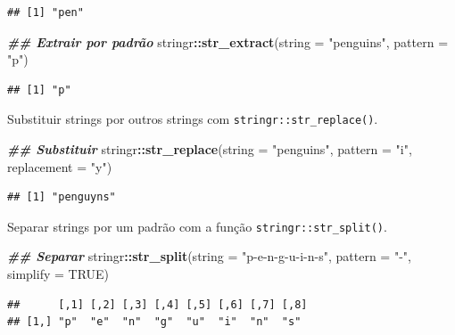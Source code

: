 \documentclass[
]{article}
\newenvironment{Shaded}{\begin{snugshade}}{\end{snugshade}}
\newcommand{\AttributeTok}[1]{\textcolor[rgb]{0.13,0.29,0.53}{#1}}
\newcommand{\ConstantTok}[1]{\textcolor[rgb]{0.56,0.35,0.01}{#1}}
\newcommand{\DocumentationTok}[1]{\textcolor[rgb]{0.56,0.35,0.01}{\textbf{\textit{#1}}}}
\newcommand{\FunctionTok}[1]{\textcolor[rgb]{0.13,0.29,0.53}{\textbf{#1}}}
\newcommand{\NormalTok}[1]{#1}
\newcommand{\SpecialCharTok}[1]{\textcolor[rgb]{0.81,0.36,0.00}{\textbf{#1}}}
\newcommand{\StringTok}[1]{\textcolor[rgb]{0.31,0.60,0.02}{#1}}
\begin{document}
\begin{verbatim}
## [1] "pen"
\end{verbatim}

\begin{Shaded}
\begin{Highlighting}[]
\DocumentationTok{\#\# Extrair por padrão}
\NormalTok{stringr}\SpecialCharTok{::}\FunctionTok{str\_extract}\NormalTok{(}\AttributeTok{string =} \StringTok{"penguins"}\NormalTok{, }\AttributeTok{pattern =} \StringTok{"p"}\NormalTok{)}
\end{Highlighting}
\end{Shaded}

\begin{verbatim}
## [1] "p"
\end{verbatim}

Substituir strings por outros strings com \texttt{stringr::str\_replace()}.

\begin{Shaded}
\begin{Highlighting}[]
\DocumentationTok{\#\# Substituir}
\NormalTok{stringr}\SpecialCharTok{::}\FunctionTok{str\_replace}\NormalTok{(}\AttributeTok{string =} \StringTok{"penguins"}\NormalTok{, }\AttributeTok{pattern =} \StringTok{"i"}\NormalTok{, }\AttributeTok{replacement =} \StringTok{"y"}\NormalTok{)}
\end{Highlighting}
\end{Shaded}

\begin{verbatim}
## [1] "penguyns"
\end{verbatim}

Separar strings por um padrão com a função \texttt{stringr::str\_split()}.

\begin{Shaded}
\begin{Highlighting}[]
\DocumentationTok{\#\# Separar}
\NormalTok{stringr}\SpecialCharTok{::}\FunctionTok{str\_split}\NormalTok{(}\AttributeTok{string =} \StringTok{"p{-}e{-}n{-}g{-}u{-}i{-}n{-}s"}\NormalTok{, }\AttributeTok{pattern =} \StringTok{"{-}"}\NormalTok{, }\AttributeTok{simplify =} \ConstantTok{TRUE}\NormalTok{)}
\end{Highlighting}
\end{Shaded}

\begin{verbatim}
##      [,1] [,2] [,3] [,4] [,5] [,6] [,7] [,8]
## [1,] "p"  "e"  "n"  "g"  "u"  "i"  "n"  "s"
\end{verbatim}
\end{document}

